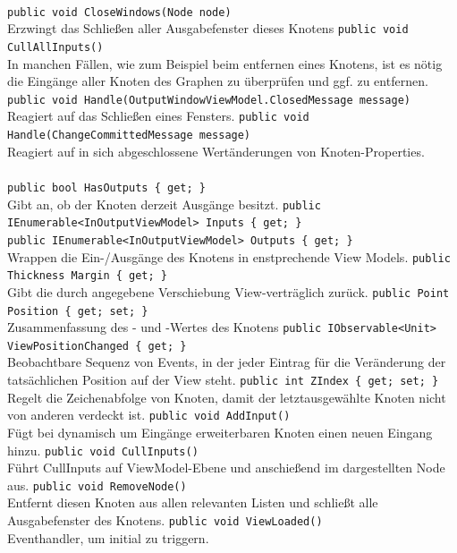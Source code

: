 \paragraph{}
\begin{itemize}
	\add \verb!public void CloseWindows(Node node)! \\
	Erzwingt das Schließen aller Ausgabefenster dieses Knotens
	\add \verb!public void CullAllInputs()! \\
	In manchen Fällen, wie zum Beispiel beim entfernen eines Knotens, ist es nötig die Eingänge aller Knoten des Graphen zu überprüfen und ggf. zu entfernen.
	\add \verb!public void Handle(OutputWindowViewModel.ClosedMessage message)! \\
	Reagiert auf das Schließen eines Fensters.
	\verb!public void Handle(ChangeCommittedMessage message)! \\
	Reagiert auf in sich abgeschlossene Wertänderungen von Knoten-Properties.
\end{itemize}

\paragraph{}
\begin{itemize}
	\add \verb!public bool HasOutputs { get; }! \\
	Gibt an, ob der Knoten derzeit Ausgänge besitzt.
	\add \verb!public IEnumerable<InOutputViewModel> Inputs { get; }! \\
	\verb!public IEnumerable<InOutputViewModel> Outputs { get; }! \\
	Wrappen die Ein-/Ausgänge des Knotens in enstprechende View Models.
	\add \verb!public Thickness Margin { get; }! \\
	Gibt die durch  angegebene Verschiebung View-verträglich zurück.
	\add \verb!public Point Position { get; set; }! \\
	Zusammenfassung des - und -Wertes des Knotens
	\add \verb!public IObservable<Unit> ViewPositionChanged { get; }! \\
	Beobachtbare Sequenz von Events, in der jeder Eintrag für die Veränderung der tatsächlichen Position auf der View steht.
	\add \verb!public int ZIndex { get; set; }! \\
	Regelt die Zeichenabfolge von Knoten, damit der letztausgewählte Knoten nicht von anderen verdeckt ist.
	\add \verb!public void AddInput()! \\
	Fügt bei dynamisch um Eingänge erweiterbaren Knoten einen neuen Eingang hinzu.
	\add \verb!public void CullInputs()! \\
	Führt CullInputs auf ViewModel-Ebene und anschießend im dargestellten Node aus.
	\add \verb!public void RemoveNode()! \\
	Entfernt diesen Knoten aus allen relevanten Listen und schließt alle Ausgabefenster des Knotens.
	\add \verb!public void ViewLoaded()! \\
	Eventhandler, um  initial zu triggern.
\end{itemize}

